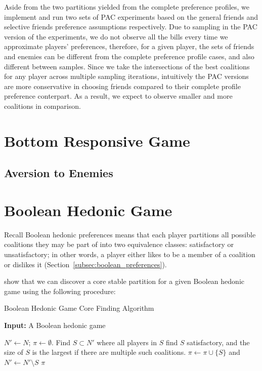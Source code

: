 Aside from the two partitions yielded from the complete preference profiles,
we implement and run two sets of PAC experiments based on the general friends
and selective friends preference assumptions respectively.
Due to sampling in the PAC version of the experiments, we do not observe all
the bills every time we approximate players' preferences,
therefore, for a given player, the sets of friends and enemies can be different
from the complete preference profile cases, and also different between samples.
Since we take the intersections of the best coalitions for any player across
multiple sampling iterations, intuitively the PAC versions are more conservative
in choosing friends compared to their complete profile preference conterpart.
As a result, we expect to observe smaller and more coalitions in comparison.


\section{Bottom Responsive Game}
\label{sec:bottom_responsive_game}

\subsection{Aversion to Enemies}
\label{subsec:aversion_to_enemies}

\section{Boolean Hedonic Game}
\label{sec:boolean_hedonic_game}

Recall Boolean hedonic preferences means that each player partitions all possible
coalitions they may be part of into two equivalence classes:
satisfactory or unsatisfactory; in other words, a player either likes to be
a member of a coalition or dislikes it (Section~\ref{subsec:boolean_preferences}).

 show that we can discover a core
stable partition for a given Boolean hedonic game using the following procedure:

\begin{algorithm}[htb]
  \caption{Boolean Hedonic Game Core Finding Algorithm}
  \label{alg:boolean_core}
  \textbf{Input:} A Boolean hedonic game
  \begin{algorithmic}[1]

  \State $N' \leftarrow N$; $\pi \leftarrow \emptyset$.
    \State \label{boolean_core:select} Find $S \subset N'$ where all players
      in $S$ find $S$ satisfactory, and the size of $S$ is the largest if there
      are multiple such coalitions.
    \State $\pi \leftarrow \pi \cup \lbrace S \rbrace$ and
      $N' \leftarrow  N' \setminus S$
  \EndWhile
  \State \Return $\pi$

  \end{algorithmic}
\end{algorithm}

